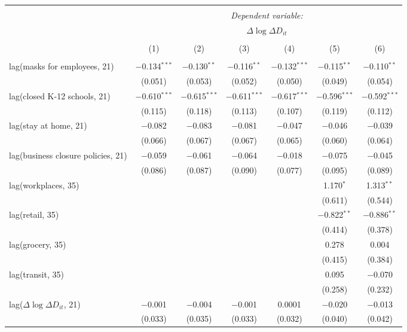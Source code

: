 \begin{tabular}{@{\extracolsep{1pt}}lcccccc} 
\\[-1.8ex]\hline 
\hline \\[-1.8ex] 
 & \multicolumn{6}{c}{\textit{Dependent variable:}} \\ 
\cline{2-7} 
 & \multicolumn{6}{c}{$\Delta \log \Delta D_{it}$} \\ 
\\[-1.8ex] & (1) & (2) & (3) & (4) & (5) & (6)\\ 
\hline \\[-1.8ex] 
 lag(masks for employees, 21) & $-$0.134$^{***}$ & $-$0.130$^{**}$ & $-$0.116$^{**}$ & $-$0.132$^{***}$ & $-$0.115$^{**}$ & $-$0.110$^{**}$ \\ 
  & (0.051) & (0.053) & (0.052) & (0.050) & (0.049) & (0.054) \\ 
  lag(closed K-12 schools, 21) & $-$0.610$^{***}$ & $-$0.615$^{***}$ & $-$0.611$^{***}$ & $-$0.617$^{***}$ & $-$0.596$^{***}$ & $-$0.592$^{***}$ \\ 
  & (0.115) & (0.118) & (0.113) & (0.107) & (0.119) & (0.112) \\ 
  lag(stay at home, 21) & $-$0.082 & $-$0.083 & $-$0.081 & $-$0.047 & $-$0.046 & $-$0.039 \\ 
  & (0.066) & (0.067) & (0.067) & (0.065) & (0.060) & (0.064) \\ 
  lag(business closure policies, 21) & $-$0.059 & $-$0.061 & $-$0.064 & $-$0.018 & $-$0.075 & $-$0.045 \\ 
  & (0.086) & (0.087) & (0.090) & (0.077) & (0.095) & (0.089) \\ 
  lag(workplaces, 35) &  &  &  &  & 1.170$^{*}$ & 1.313$^{**}$ \\ 
  &  &  &  &  & (0.611) & (0.544) \\ 
  lag(retail, 35) &  &  &  &  & $-$0.822$^{**}$ & $-$0.886$^{**}$ \\ 
  &  &  &  &  & (0.414) & (0.378) \\ 
  lag(grocery, 35) &  &  &  &  & 0.278 & 0.004 \\ 
  &  &  &  &  & (0.415) & (0.384) \\ 
  lag(transit, 35) &  &  &  &  & 0.095 & $-$0.070 \\ 
  &  &  &  &  & (0.258) & (0.232) \\ 
  lag($\Delta \log \Delta D_{it}$, 21) & $-$0.001 & $-$0.004 & $-$0.001 & 0.0001 & $-$0.020 & $-$0.013 \\ 
  & (0.033) & (0.035) & (0.033) & (0.032) & (0.040) & (0.042) \\ 

\end{tabular}
